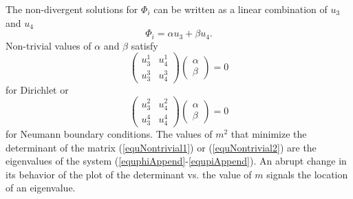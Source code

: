 The non-divergent solutions for $\Phi_{i}$ can be written as a linear combination of $u_3$ and $u_4$
\begin{equation}
\Phi_{i} = \alpha u_3 + \beta u_4.
\end{equation}   
Non-trivial values of  $\alpha$ and $\beta$ satisfy
\begin{equation}\label{equNontrivial1}
\left(\begin{array}{cc} u_3^1 & u_4^1 \\ u_3^{3} & u_4^{3} \end{array}\right)\left(\begin{array}{c} \alpha \\ \beta\end{array}\right) = 0
\end{equation}
for Dirichlet or
\begin{equation}\label{equNontrivial2}
\left(\begin{array}{cc} u_3^2 & u_4^2 \\ u_3^{4} & u_4^{4} \end{array}\right)\left(\begin{array}{c} \alpha \\ \beta\end{array}\right) = 0
\end{equation}
for Neumann boundary conditions. 
The values of $m^2$ that minimize the determinant of the matrix (\ref{equNontrivial1}) or (\ref{equNontrivial2}) are the eigenvalues of the system (\ref{equphiAppend}-\ref{equpiAppend}). 
An abrupt change in its behavior of the plot of the determinant vs. the value of $m$ signals the location of an eigenvalue. 
